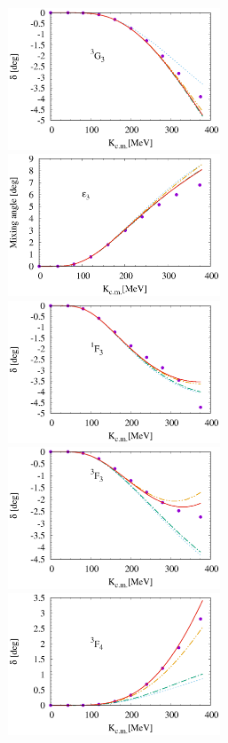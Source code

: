 \documentclass{article}
\begin{document}
\begin{figure}[htbp]
\includegraphics[width=0.5\textwidth]{7_3g3.eps}
\includegraphics[width=0.5\textwidth]{7_e3.eps}
\includegraphics[width=0.5\textwidth]{7_1f3.eps}
\includegraphics[width=0.5\textwidth]{7_3f3.eps}
\includegraphics[width=0.5\textwidth]{7_3f4.eps}

\end{figure}
\end{document}
